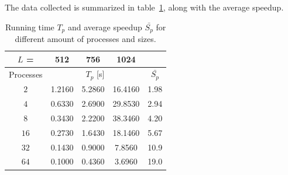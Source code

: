 The data collected is summarized in table~\ref{table:speedup_ld}, along with the average speedup.

\begin{table}[H]
\begin{center}
\begin{tabular}{c|c|c|c|c|}
$L$ =  & 512 & 756 & 1024 &  \\
\hline
Processes & \multicolumn{3}{c|}{$T_p$ [s]} & {$\bar{S_p}$} \\
\hline
$2$ & 1.2160 & 5.2860 & 16.4160 & 1.98\\
$4$ & 0.6330 & 2.6900 & 29.8530 & 2.94\\
$8$ & 0.3430 & 2.2200 & 38.3460 & 4.20\\
$16$ & 0.2730 & 1.6430 & 18.1460 & 5.67\\
$32$ & 0.1430 & 0.9000 & 7.8560 & 10.9\\
$64$ & 0.1000 & 0.4360 & 3.6960 & 19.0\\

\hline
\end{tabular}
\caption{\label{table:speedup_ld} Running time $T_p$ and average speedup $\bar{S_p}$ for different amount of processes and sizes.}
\end{center}
\end{table}




    